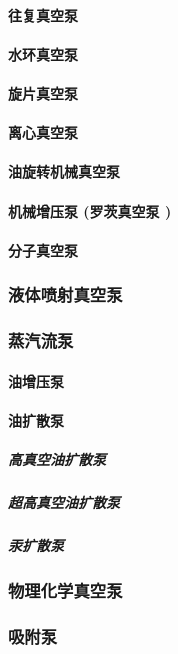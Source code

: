 \documentclass[UTF8]{../../ApplicationUniverse}
\begin{document}
            \paragraph{往复真空泵}
            \paragraph{水环真空泵}
            \paragraph{旋片真空泵}
            \paragraph{离心真空泵}
            \paragraph{油旋转机械真空泵}
            \paragraph{机械增压泵 (罗茨真空泵 )}
            \paragraph{分子真空泵}
        \subsubsection{液体喷射真空泵}
        \subsubsection{蒸汽流泵}
            \paragraph{油增压泵}
            \paragraph{油扩散泵}
                \subparagraph{高真空油扩散泵}
                \subparagraph{超高真空油扩散泵}
                \subparagraph{汞扩散泵}
        \subsubsection{物理化学真空泵}
        \subsubsection{吸附泵}
\end{document}
